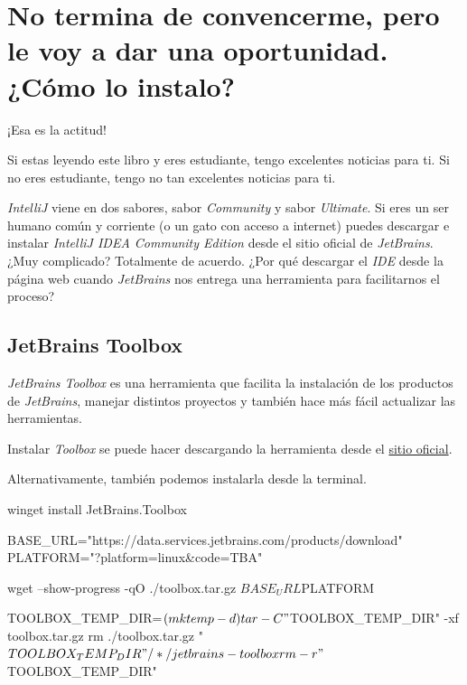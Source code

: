 \section{No termina de convencerme, pero le voy a dar una oportunidad. ¿Cómo lo instalo?}
  ¡Esa es la actitud!

  Si estas leyendo este libro y eres estudiante, tengo excelentes noticias para ti.
  Si no eres estudiante, tengo no tan excelentes noticias para ti.

  \textit{IntelliJ} viene en dos sabores, sabor \textit{Community} y sabor \textit{Ultimate}.
  Si eres un ser humano común y corriente (o un gato con acceso a internet) puedes descargar e 
  instalar \textit{IntelliJ IDEA Community Edition} desde el sitio oficial de \textit{JetBrains}.
  ¿Muy complicado?
  Totalmente de acuerdo.
  ¿Por qué descargar el \textit{IDE} desde la página web cuando \textit{JetBrains} nos entrega una
  herramienta para facilitarnos el proceso?
  
  \subsection{JetBrains Toolbox}
    \textit{JetBrains Toolbox} es una herramienta que facilita la instalación de los productos de
    \textit{JetBrains}, manejar distintos proyectos y también hace más fácil actualizar las
    herramientas.

    Instalar \textit{Toolbox} se puede hacer descargando la herramienta desde el 
    \href{https://www.jetbrains.com/toolbox-app/}{sitio oficial}.

    Alternativamente, también podemos instalarla desde la terminal.

    \begin{tcolorbox}[enhanced, breakable, title=Windows]
      \begin{powershell}
        winget install JetBrains.Toolbox
      \end{powershell}
    \end{tcolorbox}
    
    \begin{tcolorbox}[enhanced, breakable, title=Linux/Mac]
      \begin{bash}
        BASE_URL="https://data.services.jetbrains.com/products/download"
        PLATFORM="?platform=linux&code=TBA"

        wget --show-progress -qO ./toolbox.tar.gz $BASE_URL$PLATFORM
        
        TOOLBOX_TEMP_DIR=$(mktemp -d)
        tar -C "$TOOLBOX_TEMP_DIR" -xf toolbox.tar.gz
        rm ./toolbox.tar.gz
        "$TOOLBOX_TEMP_DIR"/*/jetbrains-toolbox

        rm -r "$TOOLBOX_TEMP_DIR"
      \end{bash}
    \end{tcolorbox}

